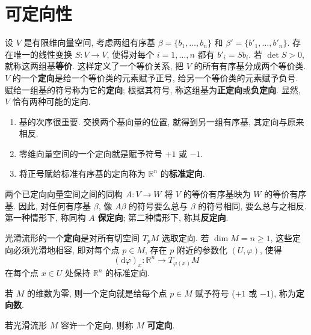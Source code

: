 \section{可定向性}\label{sec:orientability}

设 $V$ 是有限维向量空间, 考虑两组有序基 $\beta=\{b_1,\ldots,b_n\}$ 和 $\beta'=\{b'_1,\ldots,b'_n\}$. 存在唯一的线性变换 $S:V\to V$, 使得对每个 $i=1,\ldots,n$ 都有 $b'_i=Sb_i$. 若 $\det S>0$, 就称这两组基\textbf{等价}. 这样定义了一个等价关系, 把 $V$ 的所有有序基分成两个等价类. $V$ 的一个\textbf{定向}是给一个等价类的元素赋予正号, 给另一个等价类的元素赋予负号. 赋给一组基的符号称为它的\textbf{定向}; 根据其符号, 称这组基为\textbf{正定向}或\textbf{负定向}. 显然, $V$ 恰有两种可能的定向.

\begin{RiemannRemark}\label{rem:orders-and-standard-orientation}
\begin{enumerate}[label=(\arabic*),leftmargin=*]
\item 基的次序很重要. 交换两个基向量的位置, 就得到另一组有序基, 其定向与原来相反.
\item 零维向量空间的一个定向就是赋予符号 $+1$ 或 $-1$.
\item 将正号赋给标准有序基的定向称为 $\mathbb{R}^n$ 的\textbf{标准定向}.
\end{enumerate}
\end{RiemannRemark}

两个已定向向量空间之间的同构 $A:V\to W$ 将 $V$ 的等价有序基映为 $W$ 的等价有序基. 因此, 对任何有序基 $\beta$, 像 $A\beta$ 的符号要么总与 $\beta$ 的符号相同, 要么总与之相反. 第一种情形下, 称同构 $A$ \textbf{保定向}; 第二种情形下, 称其\textbf{反定向}.

光滑流形的一个\textbf{定向}是对所有切空间 $T_pM$ 选取定向. 若 $\dim M=n\geq 1$, 这些定向必须光滑地相容, 即对每个点 $p\in M$, 存在 $p$ 附近的参数化 $(U,\varphi)$, 使得
\[
  (\mathrm{d}\varphi)_x:\mathbb{R}^n\to T_{\varphi(x)}M
\]
在每个点 $x\in U$ 处保持 $\mathbb{R}^n$ 的标准定向.

\begin{RiemannRemark}\label{rem:orientation-in-dimension-zero}
若 $M$ 的维数为零, 则一个定向就是给每个点 $p\in M$ 赋予符号 ($+1$ 或 $-1$), 称为\textbf{定向数}.
\end{RiemannRemark}

\begin{RiemannDefinition}\label{def:orientable-manifold}
若光滑流形 $M$ 容许一个定向, 则称 $M$ \textbf{可定向}.
\end{RiemannDefinition}


